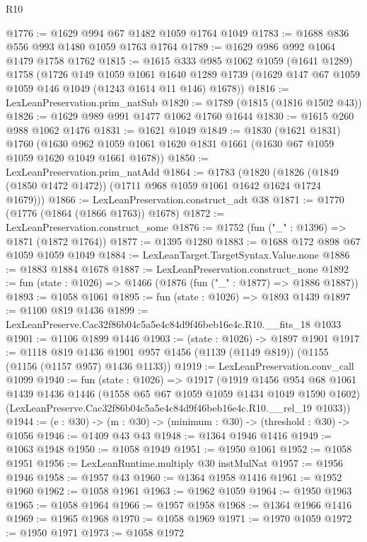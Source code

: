 \begin{lexlean}{R10}
\begin{coremodule}
@1776 := @1629 @994 @67 @1482 @1059 @1764 @1049
@1783 := @1688 @836 @556 @993 @1480 @1059 @1763 @1764
@1789 := @1629 @986 @992 @1064 @1479 @1758 @1762
@1815 := @1615
    @333
    @985
    @1062
    @1059
    (@1641 @1289)
    @1758
    (@1726
      @149
      @1059
      @1061
      @1640
      @1289
      @1739
      (@1629 @147 @67 @1059 @1059 @146 @1049 (@1243 @1614 @11 @146) @1678))
@1816 := LexLeanPreservation.prim_natSub
@1820 := @1789 (@1815 (@1816 @1502 @43))
@1826 := @1629 @989 @991 @1477 @1062 @1760 @1644
@1830 := @1615 @260 @988 @1062 @1476
@1831 := @1621 @1049
@1849 := @1830
    (@1621 @1831)
    @1760
    (@1630 @962 @1059 @1061 @1620 @1831 @1661 (@1630 @67 @1059 @1059 @1620 @1049 @1661 @1678))
@1850 := LexLeanPreservation.prim_natAdd
@1864 := @1783
    (@1820 (@1826 (@1849 (@1850 @1472 @1472)) (@1711 @968 @1059 @1061 @1642 @1624 @1724 @1679)))
@1866 := LexLeanPreservation.construct_adt @38
@1871 := @1770 (@1776 (@1864 (@1866 @1763)) @1678)
@1872 := LexLeanPreservation.construct_some
@1876 := @1752 (fun ("_" : @1396) => @1871 (@1872 @1764))
@1877 := @1395 @1280
@1883 := @1688 @172 @898 @67 @1059 @1059 @1049
@1884 := LexLeanTarget.TargetSyntax.Value.none
@1886 := @1883 @1884 @1678
@1887 := LexLeanPreservation.construct_none
@1892 := fun (state : @1026) => @1466 (@1876 (fun ("_" : @1877) => @1886 @1887))
@1893 := @1058 @1061
@1895 := fun (state : @1026) => @1893 @1439
@1897 := @1100 @819 @1436
@1899 := LexLeanPreserve.Cac32f86b04c5a5e4c84d9f46beb16e4c.R10.__fits_18 @1033
@1901 := @1106 @1899 @1446
@1903 := (state : @1026) -> @1897 @1901
@1917 := @1118
    @819
    @1436
    @1901
    @957
    @1456
    (@1139 (@1149 @819))
    (@1155 (@1156 (@1157 @957) @1436 @1133))
@1919 := LexLeanPreservation.conv_call @1099
@1940 := fun (state : @1026) =>
  @1917
    (@1919
      @1456
      @954
      @68
      @1061
      @1439
      @1436
      @1446
      (@1558 @65 @67 @1059 @1059 @1434 @1049 @1590 @1602)
      (LexLeanPreserve.Cac32f86b04c5a5e4c84d9f46beb16e4c.R10.__rel_19 @1033))
@1944 := (e : @30) -> (m : @30) -> (minimum : @30) -> (threshold : @30) -> @1056
@1946 := @1409 @43 @43
@1948 := @1364 @1946 @1416
@1949 := @1063 @1948
@1950 := @1058 @1949
@1951 := @1950 @1061
@1952 := @1058 @1951
@1956 := LexLeanRuntime.multiply @30 instMulNat
@1957 := @1956 @1946
@1958 := @1957 @43
@1960 := @1364 @1958 @1416
@1961 := @1952 @1960
@1962 := @1058 @1961
@1963 := @1962 @1059
@1964 := @1950 @1963
@1965 := @1058 @1964
@1966 := @1957 @1958
@1968 := @1364 @1966 @1416
@1969 := @1965 @1968
@1970 := @1058 @1969
@1971 := @1970 @1059
@1972 := @1950 @1971
@1973 := @1058 @1972

\end{coremodule}
\end{lexlean}
